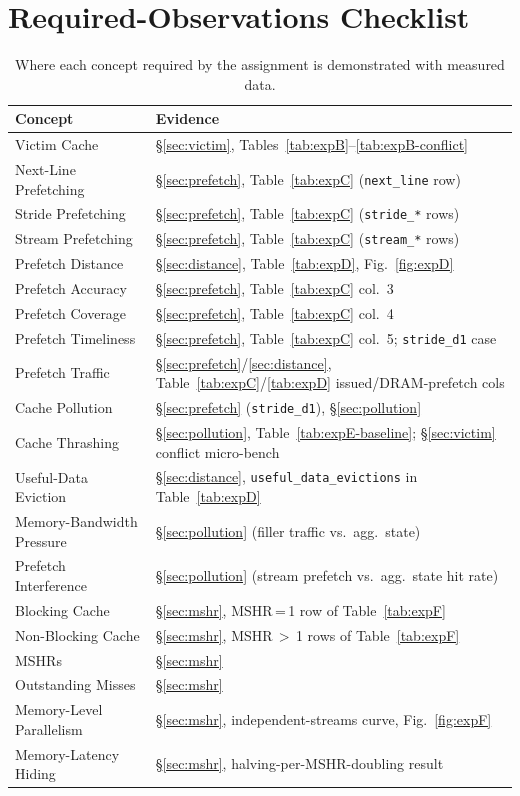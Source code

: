 \documentclass[11pt]{article}
\begin{document}
\section{Required-Observations Checklist}

\begin{table}[H]\centering\small
\begin{tabular}{ll}\toprule
Concept & Evidence \\ \midrule
Victim Cache & \S\ref{sec:victim}, Tables~\ref{tab:expB}--\ref{tab:expB-conflict} \\
Next-Line Prefetching & \S\ref{sec:prefetch}, Table~\ref{tab:expC} (\texttt{next\_line} row) \\
Stride Prefetching & \S\ref{sec:prefetch}, Table~\ref{tab:expC} (\texttt{stride\_*} rows) \\
Stream Prefetching & \S\ref{sec:prefetch}, Table~\ref{tab:expC} (\texttt{stream\_*} rows) \\
Prefetch Distance & \S\ref{sec:distance}, Table~\ref{tab:expD}, Fig.~\ref{fig:expD} \\
Prefetch Accuracy & \S\ref{sec:prefetch}, Table~\ref{tab:expC} col.\ 3 \\
Prefetch Coverage & \S\ref{sec:prefetch}, Table~\ref{tab:expC} col.\ 4 \\
Prefetch Timeliness & \S\ref{sec:prefetch}, Table~\ref{tab:expC} col.\ 5; \texttt{stride\_d1} case \\
Prefetch Traffic & \S\ref{sec:prefetch}/\ref{sec:distance}, Table~\ref{tab:expC}/\ref{tab:expD} issued/DRAM-prefetch cols \\
Cache Pollution & \S\ref{sec:prefetch} (\texttt{stride\_d1}), \S\ref{sec:pollution} \\
Cache Thrashing & \S\ref{sec:pollution}, Table~\ref{tab:expE-baseline}; \S\ref{sec:victim} conflict micro-bench \\
Useful-Data Eviction & \S\ref{sec:distance}, \texttt{useful\_data\_evictions} in Table~\ref{tab:expD} \\
Memory-Bandwidth Pressure & \S\ref{sec:pollution} (filler traffic vs.\ agg.\ state) \\
Prefetch Interference & \S\ref{sec:pollution} (stream prefetch vs.\ agg.\ state hit rate) \\
Blocking Cache & \S\ref{sec:mshr}, MSHR\,=\,1 row of Table~\ref{tab:expF} \\
Non-Blocking Cache & \S\ref{sec:mshr}, MSHR\,$>$\,1 rows of Table~\ref{tab:expF} \\
MSHRs & \S\ref{sec:mshr} \\
Outstanding Misses & \S\ref{sec:mshr} \\
Memory-Level Parallelism & \S\ref{sec:mshr}, independent-streams curve, Fig.~\ref{fig:expF} \\
Memory-Latency Hiding & \S\ref{sec:mshr}, halving-per-MSHR-doubling result \\
\bottomrule
\end{tabular}
\caption{Where each concept required by the assignment is demonstrated with measured data.}
\end{table}
\end{document}
